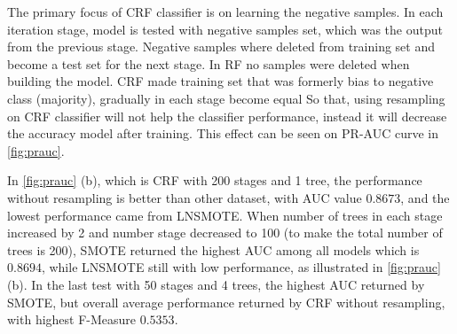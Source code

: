 The primary focus of CRF classifier is on learning the negative samples.
In each iteration stage, model is tested with negative samples set, which was
the output from the previous stage.
Negative samples where deleted from training set and become a test set for the
next stage.
In RF no samples were deleted when building the model.
CRF made training set that was formerly bias to negative class (majority),
gradually in each stage become equal
So that, using resampling on CRF classifier will not help the classifier
performance, instead it will decrease the accuracy model after training.
This effect can be seen on PR-AUC curve in \figurename \ref{fig:prauc}.

In \figurename \ref{fig:prauc} (b), which is CRF with 200 stages and 1 tree, the
performance without resampling is better than other dataset, with AUC
value $0.8673$, and the lowest performance came from LNSMOTE.
When number of trees in each stage increased by 2 and number stage decreased to
100 (to make the total number of trees is 200), SMOTE returned the highest AUC
among all models which is $0.8694$, while LNSMOTE still with low performance,
as illustrated in \figurename \ref{fig:prauc} (b).
In the last test with 50 stages and 4 trees, the highest AUC returned by SMOTE,
but overall average performance returned by CRF without resampling, with
highest F-Measure $0.5353$.
